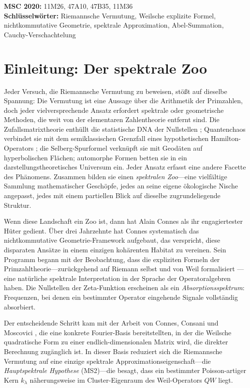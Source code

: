 \documentclass[12pt,a4paper]{article}
\theoremstyle{definition}
\theoremstyle{remark}
\begin{document}
\noindent\textbf{MSC 2020:} 11M26, 47A10, 47B35, 11M36\\
\textbf{Schlüsselwörter:} Riemannsche Vermutung, Weilsche explizite Formel, nichtkommutative Geometrie,
spektrale Approximation, Abel-Summation, Cauchy-Verschachtelung

\newpage
\tableofcontents
\newpage

\section{Einleitung: Der spektrale Zoo}
\label{sec:intro}

Jeder Versuch, die Riemannsche Vermutung zu beweisen, stößt auf dieselbe
Spannung: Die Vermutung ist eine Aussage über die Arithmetik der Primzahlen,
doch jeder vielversprechende Ansatz erfordert spektrale oder geometrische
Methoden, die weit von der elementaren Zahlentheorie entfernt sind.
Die Zufallsmatrixtheorie enthüllt die statistische DNA der Nullstellen
\cite{Montgomery1973,Odlyzko1987};
Quantenchaos verbindet sie mit dem semiklassischen Grenzfall eines
hypothetischen Hamilton-Operators \cite{BerryKeating1999};
die Selberg-Spurformel verknüpft sie mit Geodäten auf hyperbolischen Flächen;
automorphe Formen betten sie in ein darstellungstheoretisches Universum ein.
Jeder Ansatz erfasst eine andere Facette des Phänomens.
Zusammen bilden sie einen \emph{spektralen Zoo}---eine vielfältige Sammlung
mathematischer Geschöpfe, jedes an seine eigene ökologische Nische angepasst,
jedes mit einem partiellen Blick auf dieselbe zugrundeliegende Struktur.

Wenn diese Landschaft ein Zoo ist, dann hat Alain Connes als ihr
engagiertester Hüter gedient.
Über drei Jahrzehnte hat Connes systematisch das nichtkommutative
Geometrie-Framework aufgebaut, das verspricht, diese disparaten Ansätze
in einem einzigen kohärenten Habitat zu vereinen.
Sein Programm begann mit der Beobachtung, dass die expliziten Formeln der
Primzahltheorie---zurückgehend auf Riemann selbst und von Weil formalisiert
\cite{Weil1952}---eine natürliche spektrale Interpretation in der Sprache
der Operatoralgebren haben.
Die Nullstellen der Zeta-Funktion erscheinen als ein \emph{Absorptionsspektrum}:
Frequenzen, bei denen ein bestimmter Operator eingehende Signale vollständig
absorbiert.

Der entscheidende Schritt kam mit der Arbeit von Connes, Consani und Moscovici
\cite{CCM2025}, die eine konkrete Fourier-Basis bereitstellten,
in der die Weilsche quadratische Form zu einer endlich-dimensionalen Matrix
wird, die direkter Berechnung zugänglich ist.
In dieser Basis reduziert sich die Riemannsche Vermutung auf eine einzige
spektrale Approximationseigenschaft---die \emph{Hauptspektrale Hypothese}
(MS2)---die besagt, dass ein bestimmter Poisson-artiger Kern $k_\lambda$
näherungsweise im Cluster-Eigenraum des Weil-Operators $QW$ liegt.
\end{document}
